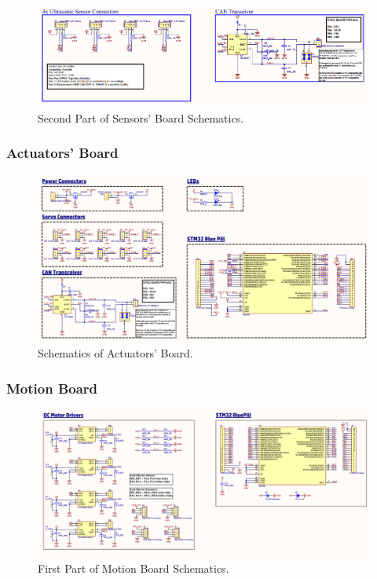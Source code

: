 \begin{figure}[h!]
	\centering
	\includegraphics[scale=0.1]{Figures/HW/schem-sensi-2.png}
	\caption{Second Part of Sensors' Board Schematics.}
	\label{fig:hw-sensi-schem-2}
\end{figure}
\newpage
\subsubsection{Actuators' Board}
\begin{figure}[h!]
	\centering
	\includegraphics[scale=0.1]{Figures/HW/schem-actuators.png}
	\caption{Schematics of Actuators' Board.}
	\label{fig:hw-servo-schem}
\end{figure}

\subsubsection{Motion Board}
\begin{figure}[h!]
	\centering
	\includegraphics[scale=0.1]{Figures/HW/schem-motor-1.png}
	\caption{First Part of Motion Board Schematics.}
	\label{fig:hw-motion-schem-1}
\end{figure}

